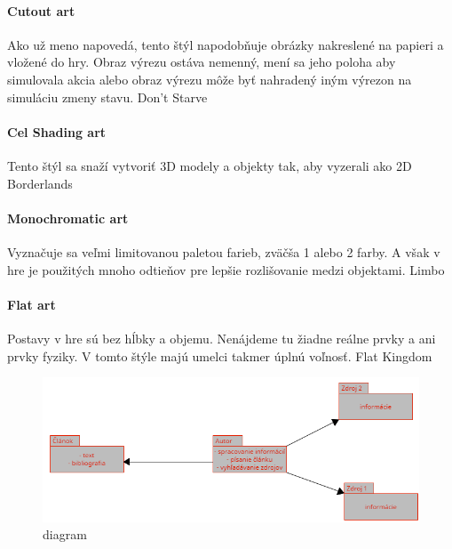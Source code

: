 \documentclass[10pt,twoside,slovak,a4paper]{article}
\begin{document}
\paragraph{Cutout art}
Ako už meno napovedá, tento štýl napodobňuje obrázky nakreslené na papieri a vložené do hry. Obraz výrezu ostáva nemenný, mení sa jeho poloha aby simulovala akcia alebo obraz výrezu môže byť nahradený iným výrezon na simuláciu zmeny stavu.
Don't Starve

\paragraph{Cel Shading art}
Tento štýl sa snaží vytvoriť 3D modely a objekty tak, aby vyzerali ako 2D
Borderlands
\paragraph{Monochromatic art}
Vyznačuje sa veľmi limitovanou paletou farieb, zväčša 1 alebo 2 farby. A však v hre je použitých mnoho odtieňov pre lepšie rozlišovanie medzi objektami.
Limbo
\paragraph{Flat art}
Postavy v hre sú bez hĺbky a objemu. Nenájdeme tu žiadne reálne prvky a ani prvky fyziky. V tomto štýle majú umelci takmer úplnú voľnosť.
Flat Kingdom

\begin{figure}
\begin{center}
\includegraphics[width=12cm]{diagram.png}
\caption{diagram}
\end{center}
\end{figure}




























\end{document}
